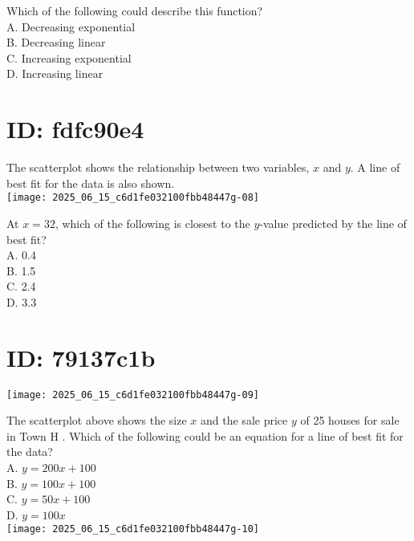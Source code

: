 Which of the following could describe this function?\\
A. Decreasing exponential\\
B. Decreasing linear\\
C. Increasing exponential\\
D. Increasing linear

\section*{ID: fdfc90e4}
The scatterplot shows the relationship between two variables, $x$ and $y$. A line of best fit for the data is also shown.\\
\texttt{[image: 2025\_06\_15\_c6d1fe032100fbb48447g-08]}

At $x=32$, which of the following is closest to the $y$-value predicted by the line of best fit?\\
A. 0.4\\
B. 1.5\\
C. 2.4\\
D. 3.3

\section*{ID: 79137c1b}
\begin{center}
\texttt{[image: 2025\_06\_15\_c6d1fe032100fbb48447g-09]}
\end{center}

The scatterplot above shows the size $x$ and the sale price $y$ of 25 houses for sale in Town H . Which of the following could be an equation for a line of best fit for the data?\\
A. $y=200 x+100$\\
B. $y=100 x+100$\\
C. $y=50 x+100$\\
D. $y=100 x$\\
\texttt{[image: 2025\_06\_15\_c6d1fe032100fbb48447g-10]}

